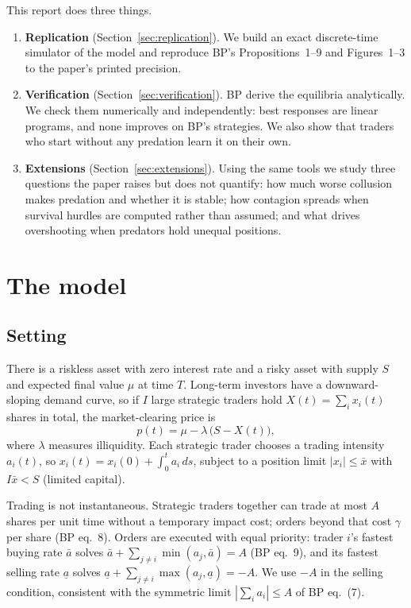 \documentclass[11pt,a4paper]{article}
\newcommand{\xbar}{\bar x}
\begin{document}
This report does three things.
\begin{enumerate}
  \item \textbf{Replication} (Section~\ref{sec:replication}). We build an exact
        discrete-time simulator of the model and reproduce BP's Propositions~1--9 and
        Figures~1--3 to the paper's printed precision.
  \item \textbf{Verification} (Section~\ref{sec:verification}). BP derive the
        equilibria analytically. We check them numerically and independently: best
        responses are linear programs, and none improves on BP's strategies. We also show
        that traders who start without any predation learn it on their own.
  \item \textbf{Extensions} (Section~\ref{sec:extensions}). Using the same tools we study
        three questions the paper raises but does not quantify: how much worse collusion
        makes predation and whether it is stable; how contagion spreads when survival
        hurdles are computed rather than assumed; and what drives overshooting when
        predators hold unequal positions.
\end{enumerate}

\section{The model}
\label{sec:model}

\subsection{Setting}
There is a riskless asset with zero interest rate and a risky asset with supply $S$ and
expected final value $\mu$ at time $T$. Long-term investors have a downward-sloping demand
curve, so if $I$ large strategic traders hold $X(t) = \sum_i x_i(t)$ shares in total, the
market-clearing price is
\begin{equation}
  p(t) = \mu - \lambda\,\bigl(S - X(t)\bigr), \label{eq:price}
\end{equation}
where $\lambda$ measures illiquidity. Each strategic trader chooses a trading intensity
$a_i(t)$, so $x_i(t) = x_i(0) + \int_0^t a_i\,ds$, subject to a position limit
$|x_i| \le \xbar$ with $I\xbar < S$ (limited capital).

Trading is not instantaneous. Strategic traders together can trade at most $A$ shares per
unit time without a temporary impact cost; orders beyond that cost $\gamma$ per share
(BP eq.~8). Orders are executed with equal priority: trader $i$'s fastest buying rate
$\bar a$ solves $\bar a + \sum_{j\ne i}\min(a_j, \bar a) = A$ (BP eq.~9), and its fastest
selling rate $\underline a$ solves $\underline a + \sum_{j\ne i}\max(a_j, \underline a) = -A$.
We use $-A$ in the selling condition, consistent with the symmetric limit $|\sum_i a_i|
\le A$ of BP eq.~(7).
\end{document}
